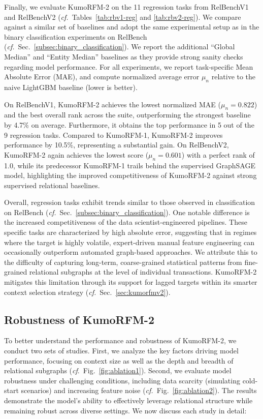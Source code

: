\documentclass{article}
\newcommand{\onezero}{1\xspace}
\newcommand{\twozero}{2\xspace}
\newcommand{\name}{KumoRFM\xspace}
\newcommand{\nameone}{\name-\onezero}
\newcommand{\nametwo}{\name-\twozero}
\begin{document}
Finally, we evaluate \nametwo on the 11 regression tasks from RelBenchV1 and RelBenchV2 (\emph{cf.}~Tables~\ref{tab:rbv1-reg} and \ref{tab:rbv2-reg}).
We compare against a similar set of baselines and adopt the same experimental setup as in the binary classification experiments on RelBench (\emph{cf.}~Sec.~\ref{subsec:binary_classification}).
We report the additional ``Global Median'' and ``Entity Median'' baselines as they provide strong sanity checks regarding model performance.
For all experiments, we report task-specific Mean Absolute Error (MAE), and compute normalized average error $\mu_n$ relative to the naive LightGBM baseline (lower is better).

On RelBenchV1, \nametwo achieves the lowest normalized MAE ($\mu_n = 0.822$) and the best overall rank across the suite, outperforming the strongest baseline by 4.7\% on average. Furthermore, it obtains the top performance in 5 out of the 9 regression tasks.
Compared to \nameone, \nametwo improves performance by 10.5\%, representing a substantial gain.
On RelBenchV2, \nametwo again achieves the lowest score ($\mu_n = 0.601$) with a perfect rank of 1.0, while its predecessor \nameone trails behind the supervised GraphSAGE model, highlighting the improved competitiveness of \nametwo against strong supervised relational baselines.

Overall, regression tasks exhibit trends similar to those observed in classification on RelBench (\emph{cf.}~Sec.~\ref{subsec:binary_classification}).
One notable difference is the increased competitiveness of the data scientist-engineered pipelines.
These specific tasks are characterized by high absolute error, suggesting that in regimes where the target is highly volatile, expert-driven manual feature engineering can occasionally outperform automated graph-based approaches.
We attribute this to the difficulty of capturing long-term, coarse-grained statistical patterns from fine-grained relational subgraphs at the level of individual transactions.
\nametwo mitigates this limitation through its support for lagged targets within its smarter context selection strategy (\emph{cf.}~Sec.~\ref{sec:kumorfmv2}).

\subsection{Robustness of \nametwo}
\label{subsec:ablations}

To better understand the performance and robustness of \nametwo, we conduct two sets of studies.
First, we analyze the key factors driving model performance, focusing on context size as well as the depth and breadth of relational subgraphs (\emph{cf}.~Fig.~\ref{fig:ablation1}).
Second, we evaluate model robustness under challenging conditions, including data scarcity (simulating cold-start scenarios) and increasing feature noise (\emph{cf.}~Fig.~\ref{fig:ablation2}).
The results demonstrate the model's ability to effectively leverage relational structure while remaining robust across diverse settings.
We now discuss each study in detail:
\end{document}
